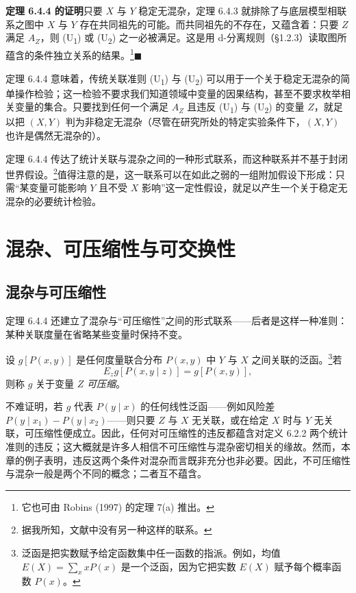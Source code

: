 \noindent\textbf{定理 6.4.4 的证明}\quad 只要 $X$ 与 $Y$ 稳定无混杂，定理 6.4.3 就排除了与底层模型相联系之图中 $X$ 与 $Y$ 存在共同祖先的可能。而共同祖先的不存在，又蕴含着：只要 $Z$ 满足 $A_Z$，则 (U\textsubscript{1}) 或 (U\textsubscript{2}) 之一必被满足。这是用 d-分离规则（\S 1.2.3）读取图所蕴含的条件独立关系的结果。\footnote{它也可由 Robins (1997) 的定理 7(a) 推出。}$\blacksquare$

定理 6.4.4 意味着，传统关联准则 (U\textsubscript{1}) 与 (U\textsubscript{2}) 可以用于一个关于稳定无混杂的简单操作检验；这一检验不要求我们知道领域中变量的因果结构，甚至不要求枚举相关变量的集合。只要找到任何一个满足 $A_Z$ 且违反 (U\textsubscript{1}) 与 (U\textsubscript{2}) 的变量 $Z$，就足以把 $(X,Y)$ 判为非稳定无混杂（尽管在研究所处的特定实验条件下，$(X,Y)$ 也许是偶然无混杂的）。

定理 6.4.4 传达了统计关联与混杂之间的一种形式联系，而这种联系并不基于封闭世界假设。\footnote{据我所知，文献中没有另一种这样的联系。}值得注意的是，这一联系可以在如此之弱的一组附加假设下形成：只需“某变量可能影响 $Y$ 且不受 $X$ 影响”这一定性假设，就足以产生一个关于稳定无混杂的必要统计检验。

\section{混杂、可压缩性与可交换性}

\subsection{混杂与可压缩性}

定理 6.4.4 还建立了混杂与“可压缩性”之间的形式联系——后者是这样一种准则：某种关联度量在省略某些变量时保持不变。

\begin{definition}[可压缩性]
设 $g[P(x,y)]$ 是任何度量联合分布 $P(x,y)$ 中 $Y$ 与 $X$ 之间关联的泛函。\footnote{泛函是把实数赋予给定函数集中任一函数的指派。例如，均值 $E(X)=\sum_x xP(x)$ 是一个泛函，因为它把实数 $E(X)$ 赋予每个概率函数 $P(x)$。}若
\[
E_z g[P(x,y\mid z)] = g[P(x,y)],
\]
则称 $g$ 关于变量 $Z$ \emph{可压缩}。
\end{definition}

不难证明，若 $g$ 代表 $P(y\mid x)$ 的任何线性泛函——例如风险差 $P(y\mid x_1)-P(y\mid x_2)$——则只要 $Z$ 与 $X$ 无关联，或在给定 $X$ 时与 $Y$ 无关联，可压缩性便成立。因此，任何对可压缩性的违反都蕴含对定义 6.2.2 两个统计准则的违反；这大概就是许多人相信不可压缩性与混杂密切相关的缘故。然而，本章的例子表明，违反这两个条件对混杂而言既非充分也非必要。因此，不可压缩性与混杂一般是两个不同的概念；二者互不蕴含。

